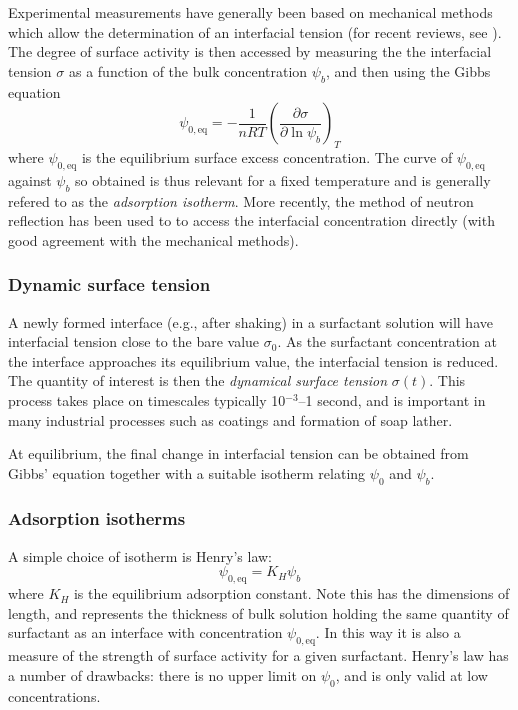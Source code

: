 Experimental measurements have generally been based on mechanical
methods which allow the determination of an interfacial tension
(for recent reviews, see \cite{chang,eastoe}). The degree of surface
activity is then accessed by measuring the the interfacial tension
$\sigma$ as a function of the bulk concentration $\psi_b$, and then
using the Gibbs equation
\begin{equation}
\psi_{0,\mathrm{eq}} = -\frac{1}{nRT}
\left( \frac{\partial \sigma}{\partial \ln \psi_b} \right)_T
\end{equation}
where $\psi_{0,\mathrm{eq}}$ is the equilibrium surface excess
concentration. The curve of $\psi_{0,\mathrm{eq}}$ against $\psi_b$
so obtained is thus relevant for a fixed temperature and is generally
refered to as the \textit{adsorption isotherm}. More recently, the
method of neutron reflection has been used to to access the interfacial
concentration directly (with good agreement with the mechanical
methods).

\subsubsection{Dynamic surface tension}

A newly formed interface (e.g., after shaking) in a surfactant
solution will have interfacial tension close to the bare value
$\sigma_0$. As the surfactant concentration at the interface
approaches its equilibrium value, the interfacial tension is
reduced. The quantity of interest is then the \textit{dynamical
surface tension} $\sigma(t)$. This process takes place on
timescales typically 10$^{-3}$--1 second, and is important in
many industrial processes such as coatings and formation of
soap lather.

At equilibrium, the final change in interfacial tension can
be obtained from Gibbs' equation together with a suitable
isotherm relating $\psi_0$ and $\psi_b$. 

\subsubsection{Adsorption isotherms}

A simple choice of isotherm is Henry's law:
\begin{equation}
\psi_{0,\mathrm{eq}} = K_H \psi_b
\label{eq:iso:henry}
\end{equation}
where $K_H$ is the equilibrium adsorption constant. Note this has the
dimensions of length, and represents the thickness of bulk solution
holding the same quantity of surfactant as an interface with
concentration $\psi_{0,\mathrm{eq}}$. In this way it is also a
measure of the strength of surface activity for a given surfactant.
Henry's law has a number of drawbacks: there is no upper limit
on $\psi_0$, and is only valid at low concentrations.

